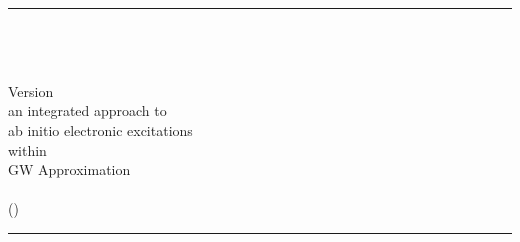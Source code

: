 \documentclass[11pt]{article}
\begin{document}
\thispagestyle{empty}

\vspace*{1.2in}

\begin{centering}
  \rule{6.5in}{0.04in}                            \\  \vspace{0.25in}
  {\Huge \SAX\ \UGTITLE  }                       \\  \vspace{0.25in}
  {} \\ \vspace{0.25in}
  {\Large Version \SAXVERSION}                   \\  \vspace{0.25in}
  {\Large {\sc an integrated approach to}}        \\  \vspace{0.10in}
  {\Huge  {\sc ab initio electronic excitations}}   \\  \vspace{0.10in}
  {\Huge {\sc within}} \\ \vspace{0.10in}
  {\Huge  {\sc GW Approximation}} \\  \vspace{0.10in}
  {\Large \SAXDATE}                              \\  \vspace{0.10in}
  {\Large (\SAXURL)}                             \\  \vspace{0.25in}
  \rule{6.5in}{0.04in}                            \\  \vspace{0.25in}
\end{centering}
  \noindent \UGDESC
\end{document}
